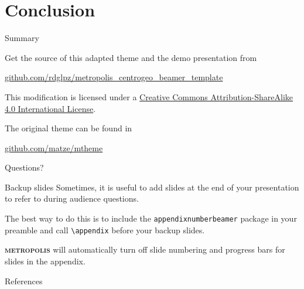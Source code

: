 \documentclass[10pt]{beamer}
\newcommand{\themename}{\textbf{\textsc{metropolis}}\xspace}
\begin{document}
\section{Conclusion}

\begin{frame}{Summary}

  Get the source of this adapted theme and the demo presentation from
	\begin{center}\url{github.com/rdglpz/metropolis_centrogeo_beamer_template}\end{center}
  

  This modification is licensed under a
  \href{http://creativecommons.org/licenses/by-sa/4.0/}{Creative Commons
  Attribution-ShareAlike 4.0 International License}.

The original theme can be found in 
\begin{center}\url{github.com/matze/mtheme}\end{center}

  \begin{center}\ccbysa\end{center}

\end{frame}

{
\begin{frame}[standout]
  Questions?
\end{frame}
}

\appendix

\begin{frame}[fragile]{Backup slides}
  Sometimes, it is useful to add slides at the end of your presentation to
  refer to during audience questions.

  The best way to do this is to include the \verb|appendixnumberbeamer|
  package in your preamble and call \verb|\appendix| before your backup slides.

  \themename will automatically turn off slide numbering and progress bars for
  slides in the appendix.
\end{frame}

\begin{frame}[allowframebreaks]{References}

  
  

\end{frame}
\end{document}
